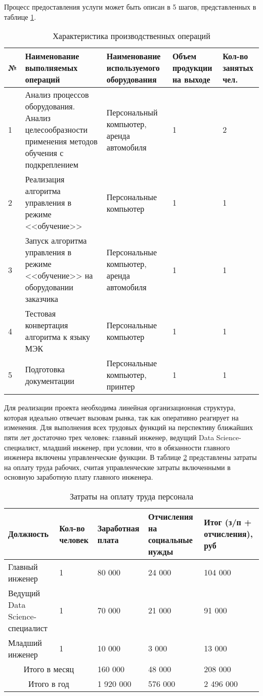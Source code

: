 Процесс предоставления услуги может быть описан в 5 шагов, представленных в таблице \ref{tab:step1}.

\begin{table}[h!]
	\caption{Характеристика производственных операций}
	\label{tab:step1}
	\small
	\centering
	\begin{tabular}{|p{0.4cm}|p{4.2cm}|p{4.2cm}|p{2.5cm}|p{2.5cm}|}
		\hline
		№ & Наименование выполняемых операций & Наименование используемого оборудования & Объем продукции на выходе & Кол-во занятых чел.\\
		\hline
		1 & Анализ процессов оборудования. Анализ целесообразности применения методов обучения с подкреплением & Персональный компьютер, аренда автомобиля & 1 & 2\\
		\hline
		2 & Реализация алгоритма управления в режиме <<обучение>> & Персональные компьютер & 1 & 1\\
		\hline
		3 & Запуск алгоритма управления в режиме <<обучение>> на оборудовании заказчика & Персональные компьютер, аренда автомобиля & 1 & 1\\
		\hline
		4 & Тестовая конвертация алгоритма к языку МЭК & Персональные компьютер & 1 & 1\\
		\hline
		5 & Подготовка документации & Персональные компьютер, принтер & 1 & 1\\
		\hline
	\end{tabular}
\end{table}


Для реализации проекта необходима линейная организационная структура, которая идеально отвечает вызовам рынка, так как оперативно реагирует на изменения. Для выполнения всех трудовых функций на перспективу ближайших пяти лет достаточно трех человек: главный инженер, ведущий Data Science-специалист, младший инженер, при условии, что в обязанности главного инженера включены управленческие функции. В таблице \ref{tab:salary} представлены затраты на оплату труда рабочих, считая управленческие затраты включенными в основную заработную плату главного инженера. 

\begin{table}[h!]
	\caption{Затраты на оплату труда персонала}
	\small
	\label{tab:salary}
	\centering
	\begin{tabular}{|p{3cm}|p{2cm}|p{3cm}|p{3cm}|p{3cm}|}
		\hline
		Должность & Кол-во человек & Заработная плата & Отчисления на социальные нужды & Итог (з/п + отчисления), руб \\
		\hline
		Главный инженер & 1 & 80 000 & 24 000 & 104 000 \\
		\hline
		Ведущий Data Science-специалист & 1 & 70 000 & 21 000 & 91 000 \\
		\hline
		Младший инженер & 1 & 10 000 & 3 000 & 13 000 \\
		\hline
		\multicolumn{2}{|c|}{Итого в месяц} & 160 000 & 48 000 & 208 000 \\
		\hline
		\multicolumn{2}{|c|}{Итого в год} & 1 920 000 & 576 000 & 2 496 000\\
		\hline
	\end{tabular}
\end{table}

